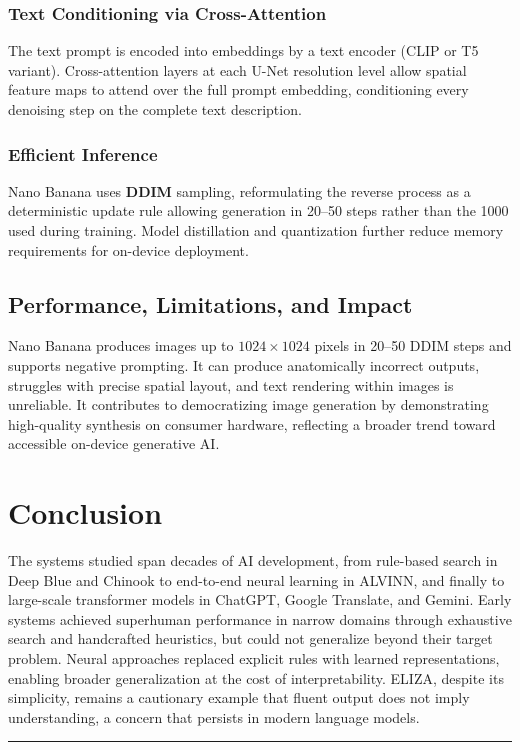 \documentclass[12pt,a4paper]{report}
\newcommand{\divline}{
    \vspace{1em}
    \begin{center}
        \rule{0.8\textwidth}{0.6pt}
    \end{center}
    \vspace{1em}
}
\begin{document}
\subsubsection{Text Conditioning via Cross-Attention}
The text prompt is encoded into embeddings by a text encoder (CLIP or T5 variant). Cross-attention layers at each U-Net resolution level allow spatial feature maps to attend over the full prompt embedding, conditioning every denoising step on the complete text description.

\subsubsection{Efficient Inference}
Nano Banana uses \textbf{DDIM} sampling, reformulating the reverse process as a deterministic update rule allowing generation in 20--50 steps rather than the 1000 used during training. Model distillation and quantization further reduce memory requirements for on-device deployment.

\subsection{Performance, Limitations, and Impact}
Nano Banana produces images up to $1024\times1024$ pixels in 20--50 DDIM steps and supports negative prompting. It can produce anatomically incorrect outputs, struggles with precise spatial layout, and text rendering within images is unreliable. It contributes to democratizing image generation by demonstrating high-quality synthesis on consumer hardware, reflecting a broader trend toward accessible on-device generative AI.

\section{Conclusion}
The systems studied span decades of AI development, from rule-based search in Deep Blue and Chinook to end-to-end neural learning in ALVINN, and finally to large-scale transformer models in ChatGPT, Google Translate, and Gemini. Early systems achieved superhuman performance in narrow domains through exhaustive search and handcrafted heuristics, but could not generalize beyond their target problem. Neural approaches replaced explicit rules with learned representations, enabling broader generalization at the cost of interpretability. ELIZA, despite its simplicity, remains a cautionary example that fluent output does not imply understanding, a concern that persists in modern language models.
\\
\divline
\end{document}
